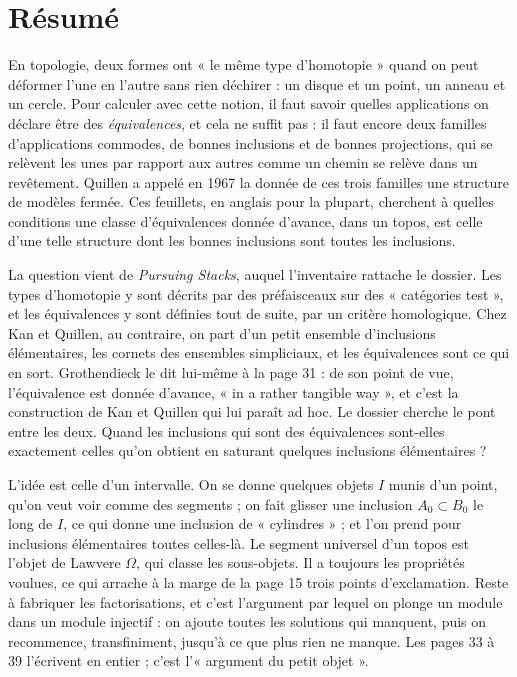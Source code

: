 \documentclass[11pt,a4paper]{article}
\begin{document}
\section*{Résumé}

\begin{resume}
En topologie, deux formes ont « le même type d'homotopie » quand on peut
déformer l'une en l'autre sans rien déchirer : un disque et un point, un
anneau et un cercle. Pour calculer avec cette notion, il faut savoir quelles
applications on déclare être des \emph{équivalences}, et cela ne suffit pas :
il faut encore deux familles d'applications commodes, de bonnes inclusions et
de bonnes projections, qui se relèvent les unes par rapport aux autres comme un
chemin se relève dans un revêtement. Quillen a appelé en 1967 la donnée de ces
trois familles une structure de modèles fermée. Ces feuillets, en anglais pour
la plupart, cherchent à quelles conditions une classe d'équivalences donnée
d'avance, dans un topos, est celle d'une telle structure dont les bonnes
inclusions sont toutes les inclusions.

La question vient de \emph{Pursuing Stacks}, auquel l'inventaire rattache le
dossier. Les types d'homotopie y sont décrits par des préfaisceaux sur des
« catégories test », et les équivalences y sont définies tout de suite, par un
critère homologique. Chez Kan et Quillen, au contraire, on part d'un petit
ensemble d'inclusions élémentaires, les cornets des ensembles simpliciaux, et
les équivalences sont ce qui en sort. Grothendieck le dit lui-même à la page
31 : de son point de vue, l'équivalence est donnée d'avance, « in a rather
tangible way », et c'est la construction de Kan et Quillen qui lui paraît ad hoc.
Le dossier cherche le pont entre les deux. Quand les inclusions qui sont des
équivalences sont-elles exactement celles qu'on obtient en saturant quelques
inclusions élémentaires ?

L'idée est celle d'un intervalle. On se donne quelques objets $I$ munis d'un
point, qu'on veut voir comme des segments ; on fait glisser une inclusion
$A_0 \subset B_0$ le long de $I$, ce qui donne une inclusion de « cylindres » ;
et l'on prend pour inclusions élémentaires toutes celles-là. Le segment
universel d'un topos est l'objet de Lawvere $\Omega$, qui classe les
sous-objets. Il a toujours les propriétés voulues, ce qui arrache à la marge de
la page 15 trois points d'exclamation. Reste à fabriquer les factorisations,
et c'est l'argument par lequel on plonge un module dans un module injectif : on
ajoute toutes les solutions qui manquent, puis on recommence, transfiniment,
jusqu'à ce que plus rien ne manque. Les pages 33 à 39 l'écrivent en entier ;
c'est l'« argument du petit objet ».


\end{resume}
\end{document}
